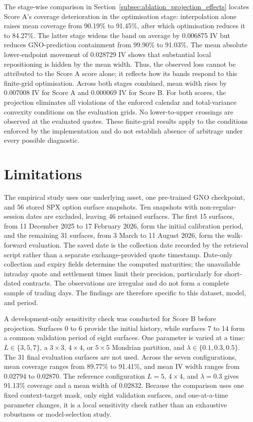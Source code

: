 The stage-wise comparison in Section~\ref{subsec:ablation_projection_effects} locates Score A's coverage deterioration in the optimisation stage: interpolation alone raises mean coverage from 90.19\% to 91.45\%, after which optimisation reduces it to 84.27\%. The latter stage widens the band on average by 0.006875 IV but reduces GNO-prediction containment from 99.90\% to 91.03\%. The mean absolute lower-endpoint movement of 0.028729 IV shows that substantial local repositioning is hidden by the mean width. Thus, the observed loss cannot be attributed to the Score A score alone; it reflects how its bands respond to this finite-grid optimisation. Across both stages combined, mean width rises by 0.007008 IV for Score A and 0.000069 IV for Score B. For both scores, the projection eliminates all violations of the enforced calendar and total-variance convexity conditions on the evaluation grids. No lower-to-upper crossings are observed at the evaluated quotes. These finite-grid results apply to the conditions enforced by the implementation and do not establish absence of arbitrage under every possible diagnostic.

\section{Limitations}
\label{sec:disc_limitations}

The empirical study uses one underlying asset, one pre-trained GNO checkpoint, and 56 stored SPX option surface snapshots. Ten snapshots with non-regular-session dates are excluded, leaving 46 retained surfaces. The first 15 surfaces, from 11 December 2025 to 17 February 2026, form the initial calibration period, and the remaining 31 surfaces, from 3 March to 11 August 2026, form the walk-forward evaluation. The saved date is the collection date recorded by the retrieval script rather than a separate exchange-provided quote timestamp. Date-only collection and expiry fields determine the computed maturities; the unavailable intraday quote and settlement times limit their precision, particularly for short-dated contracts. The observations are irregular and do not form a complete sample of trading days. The findings are therefore specific to this dataset, model, and period.

A development-only sensitivity check was conducted for Score B before projection. Surfaces 0 to 6 provide the initial history, while surfaces 7 to 14 form a common validation period of eight surfaces. One parameter is varied at a time: $L\in\{3,5,7\}$, a $3\times3$, $4\times4$, or $5\times5$ Mondrian partition, and $\lambda\in\{0.1,0.3,0.5\}$. The 31 final evaluation surfaces are not used. Across the seven configurations, mean coverage ranges from 89.77\% to 91.41\%, and mean IV width ranges from 0.02794 to 0.02870. The reference configuration $L=5$, $4\times4$, and $\lambda=0.3$ gives 91.13\% coverage and a mean width of 0.02832. Because the comparison uses one fixed context-target mask, only eight validation surfaces, and one-at-a-time parameter changes, it is a local sensitivity check rather than an exhaustive robustness or model-selection study.

